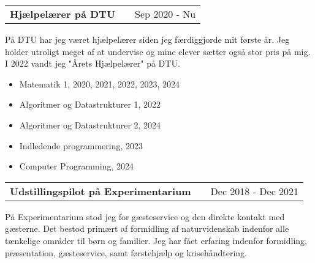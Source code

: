 \documentclass[a4paper,12pt]{article}
\makeatletter
\newenvironment{jobshort}[2]
    {
    \begin{tabularx}{\linewidth}{@{}l X r@{}}
    \textbf{#1} & \hfill &  #2 \\[3.75pt]
    \end{tabularx}
    }
    {
    }
\makeatother
\begin{document}
\begin{jobshort}{Hjælpelærer på DTU}{Sep 2020 - Nu}
På DTU har jeg været hjælpelærer siden jeg færdiggjorde mit første år. Jeg holder utroligt meget af at undervise og mine elever sætter også stor pris på mig. I 2022 vandt jeg "Årets Hjælpelærer" på DTU. 
\begin{minipage}[t]{\linewidth}\vspace{-2pt}
\begin{itemize}[nosep,after=\strut, leftmargin=1em, itemsep=3pt,label=--]
    \item Matematik 1, 2020, 2021, 2022, 2023, 2024
    \item Algoritmer og Datastrukturer 1, 2022
    \item Algoritmer og Datastrukturer 2, 2024
    \item Indledende programmering, 2023
    \item Computer Programming, 2024
\end{itemize}
\end{minipage}
\end{jobshort}


\begin{jobshort}{Udstillingspilot på Experimentarium}{Dec 2018 - Dec 2021}
På Experimentarium stod jeg for gæsteservice og den direkte kontakt med gæsterne. Det bestod primært af formidling af naturvidenskab indenfor alle tænkelige områder til børn og familier. Jeg har fået erfaring indenfor formidling, præsentation, gæsteservice, samt førstehjælp og krisehåndtering. 
\end{jobshort}
  

\end{document}
